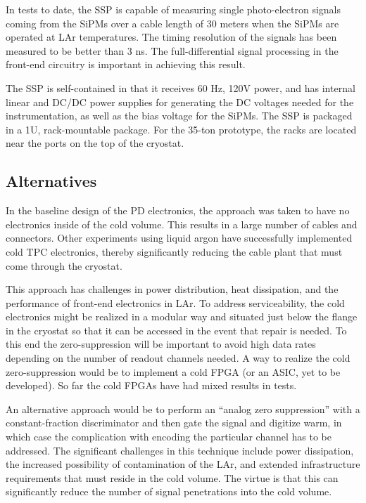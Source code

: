 In tests to date, the SSP is capable of measuring single
photo-electron signals coming from the SiPMs over a cable length of 30
meters when the SiPMs are operated at LAr temperatures.  The timing
resolution of the signals has been measured to be better than 3 ns.
The full-differential signal processing in the front-end circuitry is
important in achieving this result.
 
The SSP is self-contained in that it receives 60 Hz, 120V power, and
has internal linear and DC/DC power supplies for generating the DC
voltages needed for the instrumentation, as well as the bias voltage
for the SiPMs.  The SSP is packaged in a 1U, rack-mountable
package. For the 35-ton prototype, the racks are located near the
ports on the top of the cryostat.

\subsection{Alternatives}
\label{sec_alt}

In the baseline design of the PD electronics, the approach was taken
to have no electronics inside of the cold volume.  This results in a
large number of cables and connectors.  Other experiments using liquid
argon have successfully implemented cold TPC electronics, thereby
significantly reducing the cable plant that must come through the
cryostat.  

This approach has challenges in power distribution, heat
dissipation, and the performance of front-end electronics in LAr. To
address serviceability, the cold electronics might be realized in a
modular way and situated just below the flange in the cryostat so that
it can be accessed in the event that repair is needed.  To this end
the zero-suppression will be important to avoid high data rates
depending on the number of readout channels needed. A way to realize
the cold zero-suppression would be to implement a cold FPGA (or an
ASIC, yet to be developed).  So far the cold FPGAs have had mixed
results in tests. 

An alternative approach would be to perform an ``analog
zero suppression'' with a constant-fraction discriminator and then gate
the signal and digitize warm, in which case the complication with
encoding the particular channel has to be addressed.  The significant
challenges in this technique include power dissipation, the increased
possibility of contamination of the LAr, and extended infrastructure
requirements that must reside in the cold volume.  The virtue is that
this can significantly reduce the number of signal penetrations into
the cold volume.

